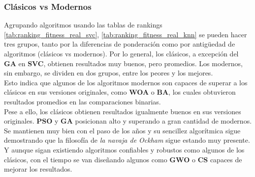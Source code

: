 \subsubsection{Clásicos vs Modernos}
Agrupando algoritmos usando las tablas de rankings \ref{tab:ranking_fitness_real_svc}, \ref{tab:ranking_fitness_real_knn} se pueden hacer tres grupos, tanto por la diferencias de ponderación como por antigüedad de algoritmos (clásicos vs modernos). Por lo general, los clásicos, a excepción del \textbf{GA} en \textbf{SVC}, obtienen resultados muy buenos, pero promedios. Los modernos, sin embargo, se dividen en dos grupos, entre los peores y los mejores.\\[6pt]
Esto indica que algunos de los algoritmos modernos son capaces de superar a los clásicos en sus versiones originales, como \textbf{WOA} o \textbf{BA}, los cuales obtuvieron resultados promedios en las comparaciones binarias.\\[6pt]
Pese a ello, los clásicos obtienen resultados igualmente buenos en sus versiones originales. \textbf{PSO} y \textbf{GA} posicionan alto y superando a gran cantidad de modernos. Se mantienen muy bien con el paso de los años y su sencillez algorítmica sigue demostrando que la filosofía de \textit{la navaja de Ockham} sigue estando muy presente.\\[6pt]
Y aunque sigan existiendo algoritmos confiables y robustos como algunos de los clásicos, con el tiempo se van diseñando algunos como \textbf{GWO} o \textbf{CS} capaces de mejorar los resultados.

